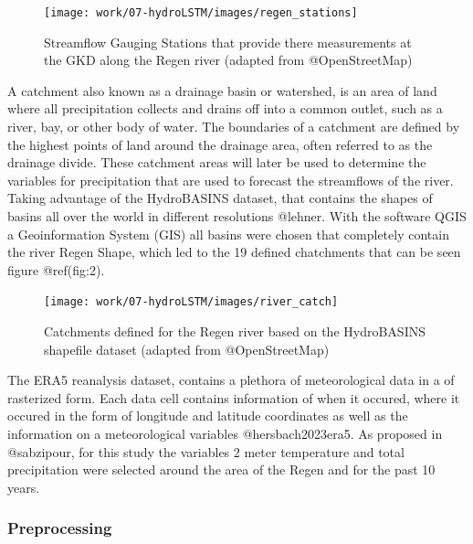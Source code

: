 \documentclass[
]{article}
\begin{document}
\begin{figure}

{\centering \texttt{[image: work/07-hydroLSTM/images/regen\_stations]} 

}

\caption{Streamflow Gauging Stations that provide there measurements at the GKD along the Regen river (adapted from @OpenStreetMap)}\label{fig:1}
\end{figure}

A catchment also known as a drainage basin or watershed, is an area of
land where all precipitation collects and drains off into a common
outlet, such as a river, bay, or other body of water. The boundaries of
a catchment are defined by the highest points of land around the
drainage area, often referred to as the drainage divide. These catchment
areas will later be used to determine the variables for precipitation
that are used to forecast the streamflows of the river. Taking advantage
of the HydroBASINS dataset, that contains the shapes of basins all over
the world in different resolutions @lehner. With the software QGIS a
Geoinformation System (GIS) all basins were chosen that completely
contain the river Regen Shape, which led to the 19 defined chatchments
that can be seen figure @ref(fig:2).

\begin{figure}

{\centering \texttt{[image: work/07-hydroLSTM/images/river\_catch]} 

}

\caption{Catchments defined for the Regen river based on the HydroBASINS shapefile dataset (adapted from @OpenStreetMap)}\label{fig:2}
\end{figure}

The ERA5 reanalysis dataset, contains a plethora of meteorological data
in a of rasterized form. Each data cell contains information of when it
occured, where it occured in the form of longitude and latitude
coordinates as well as the information on a meteorological variables
@hersbach2023era5. As proposed in @sabzipour, for this study the
variables 2 meter temperature and total precipitation were selected
around the area of the Regen and for the past 10 years.

\hypertarget{preprocessing}{%
\subsubsection{Preprocessing}\label{preprocessing}}
\end{document}

